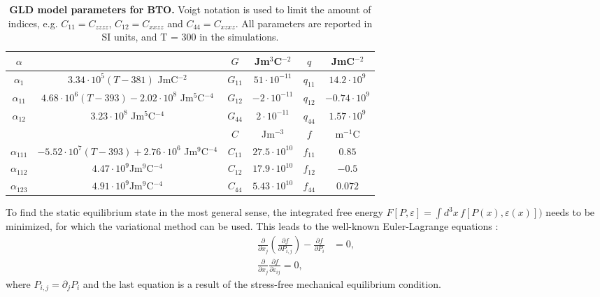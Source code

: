 \begin{table}
\begin{tabular}{|c|c|c|c|c|c|}
	\hline
	 $\alpha$ & & $G$ & Jm$^3$C$^{-2}$& $q$ & JmC$^{-2}$\\
	 \hline
	 $\alpha_1$ & $3.34\cdot 10^5 (T - 381)$  JmC$^{-2}$& $G_{11}$ & $51 \cdot 10^{-11}$ & $q_{11}$ & $14.2 \cdot 10^{9}$ \\
	 $\alpha_{11}$ & $4.68 \cdot 10^6 (T-393) - 2.02 \cdot 10^8$ Jm$^5$C$^{-4}$& $G_{12}$ & $-2 \cdot 10^{-11}$ & $q_{12}$ & $-0.74 \cdot 10^{9}$ \\
	 $\alpha_{12}$ & $3.23 \cdot 10^8$ Jm$^5$C$^{-4}$ & $G_{44}$ & $2 \cdot 10^{-11}$  & $q_{44}$ & $1.57 \cdot 10^{9}$ \\
	 \cline{3-6}
	 & & $C$ &Jm$^{-3}$ & $f$ & m$^{-1}$C\\
	 \cline{3-6}
	 $\alpha_{111}$ & $-5.52 \cdot 10^7 (T - 393) + 2.76 \cdot 10^6 $ Jm$^9$C$^{-4}$ & $C_{11}$ & $27.5 \cdot 10^{10}$ & $f_{11}$ & $0.85$ \\
	 $\alpha_{112}$ &  $4.47 \cdot 10^9 $Jm$^9$C$^{-4}$  & $C_{12}$ & $17.9 \cdot 10^{10}$ & $f_{12}$ & $-0.5$  \\
	 $\alpha_{123}$ & $4.91 \cdot 10^9$Jm$^9$C$^{-4}$  &$C_{44}$ & $5.43 \cdot 10^{10}$ & $f_{44}$ & $ 0.072$ \\
	 \hline
\end{tabular}
\caption{{\bf GLD model parameters for BTO.} Voigt notation \cite{Voigt} is used to limit the amount of indices, e.g. $C_{11} = C_{zzzz}$, $C_{12} = C_{xxzz}$ and $C_{44}= C_{xzxz}$.  All parameters are reported in SI units, and T = 300 in the simulations.\label{tab:BTO_param}}
\end{table}
To find the static equilibrium state in the most general sense, the integrated free energy $F[P,\varepsilon] = \int d^3x \,f[P(x), \varepsilon(x)])$ needs to be minimized, for which the variational method can be used.
This leads to the well-known Euler-Lagrange equations \cite{Cao1991, Marton2010}:
\begin{align}
	\label{eq:BTO_euler}
	\frac{\partial}{\partial x_j}\left( \frac{\partial f}{\partial P_{i,j}}\right) - \frac{\partial f}{\partial P_i} &= 0, \\
	\frac{\partial}{\partial x_j}\frac{\partial f}{\partial \varepsilon_{ij}} = 0,
\end{align}
where $P_{i,j} = \partial_j P_i$ and the last equation is a result of the stress-free mechanical equilibrium condition.
\\\\
